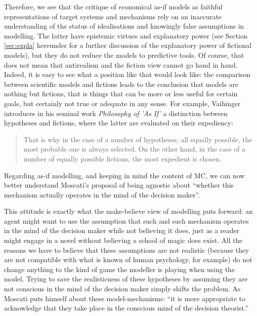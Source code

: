 \documentclass[a4paper,11pt]{article}
\theoremstyle{definition}
\begin{document}
Therefore, we see that the critique of economical as-if models as faithful representations of target systems and mechanisms rely on an inaccurate understanding of the status of idealisations and knowingly false assumptions in modelling. The latter have epistemic virtues and explanatory power (see Section \ref{sec:expla} hereunder for a further discussion of the explanatory power of fictional models), but they do not reduce the models to predictive tools. Of course, that does not mean that antirealism and the fiction view cannot go hand in hand. Indeed, it is easy to see what a position like that would look like: the comparison between scientific models and fictions leads to the conclusion that models are nothing but fictions, that is things that can be more or less useful for certain goals, but certainly not true or adequate in any sense. For example, Vaihinger introduces in his seminal work \textit{Philosophy of 'As If'} a distinction between hypotheses and fictions, where the latter are evaluated on their expediency:

\begin{quote}
    That is why in the case of a number of hypotheses, all equally possible, the most probable one is always selected. On the other hand, in the case of a number of equally possible fictions, the most expedient is chosen. \citep[p.~85, note 1]{Vaihinger2009}
\end{quote}

Regarding as-if modelling, and keeping in mind the content of MC, we can now better understand Moscati's proposal of being agnostic about ``whether this mechanism actually operates in the mind of the decision maker''. \citep[p.~2]{Moscati2023}

This attitude is exactly what the make-believe view of modelling puts forward: an agent might want to use the assumption that such and such mechanism operates in the mind of the decision maker while not believing it does, just as a reader might engage in a novel without believing a school of magic does exist. All the reasons we have to believe that these assumptions are not realistic (because they are not compatible with what is known of human psychology, for example) do not change anything to the kind of game the modeller is playing when using the model. Trying to save the realisticness of these hypotheses by assuming they are not conscious in the mind of the decision maker simply shifts the problem. As Moscati puts himself about these model-mechanisms: ``it is more appropriate to acknowledge that they take place in the conscious mind of the decision theorist.'' \citep[p.~12]{Moscati2023}
\end{document}
